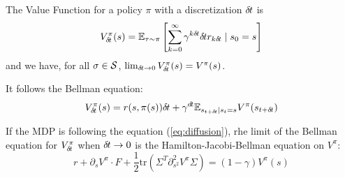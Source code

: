 The Value Function for a policy $\pi$ with a discretization ${\delta\hspace{-.1em}t}$ is
\begin{equation}
  V^\pi_{\delta\hspace{-.1em}t}(s) = \mathbb{E}_{\tau\sim\pi}\left[\sum\limits_{k=0}^\infty \gamma^{k{\delta\hspace{-.1em}t}}{\delta\hspace{-.1em}t} r_{k{\delta\hspace{-.1em}t}} \mid s_0 = s\right]
\end{equation}
and we have, for all $\sigma \in {\cal S}$, $\lim_{{\delta\hspace{-.1em}t} \rightarrow 0} V^\pi_{\delta\hspace{-.1em}t}(s) = V^\pi(s)$. 

It follows the Bellman equation:
\begin{equation}
  \label{eq:bellman}
  V^\pi_{\delta\hspace{-.1em}t}(s) = {r}(s, \pi(s)){\delta\hspace{-.1em}t} + \gamma^{d\hspace{-.1em}t} \mathbb{E}_{s_{t+{\delta\hspace{-.1em}t}} | s_t = s} V^\pi(s_{t+{\delta\hspace{-.1em}t}})
\end{equation}

If the MDP is following the equation (\ref{eq:diffusion}), rhe limit of the Bellman equation for $V^\pi_{\delta\hspace{-.1em}t}$ when ${\delta\hspace{-.1em}t} \rightarrow 0$ is the Hamilton-Jacobi-Bellman equation on $V^\pi$:
\begin{equation}
  \label{eq:hamilton-jacobi-bellman}
  r + \partial_s V^\pi \cdot F + \frac{1}{2} \text{tr}\left(\Sigma^T\partial^2_{s^2} V^\pi\Sigma\right) = (1 - \gamma) V^\pi(s)
\end{equation}



